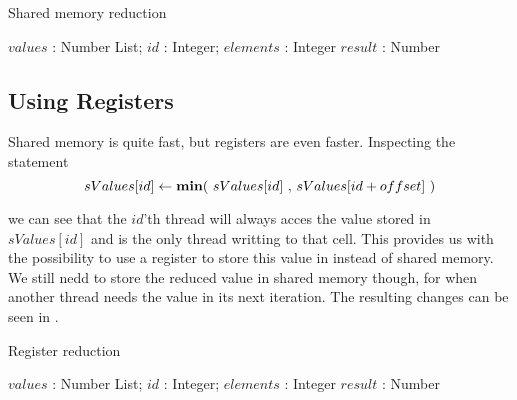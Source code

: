 \begin{algorithm}
  \caption{Shared memory reduction}
  \label{alg:sharedReduct}
  \begin{algorithmic}
              {$values$ : Number List; $id$ : Integer; $elements$ : Integer}
              {$result$ : Number}
              {
                \SYNC
                  \ENDIF
                  \SYNC
                \ENDWHILE
                \ENDIF
              }
  \end{algorithmic}
\end{algorithm}

\subsection{Using Registers}

Shared memory is quite fast, but registers are even faster. Inspecting
the statement 
\begin{displaymath}
  sValues[id] \leftarrow \text{\textbf{min}$($ $sValues[id]$ , $sValues[id + offset]$ $)$}
\end{displaymath}

we can see that the $id$'th thread will always acces the value stored
in $sValues[id]$ and is the only thread writting to that cell. This
provides us with the possibility to use a register to store this value
in instead of shared memory. We still nedd to store the reduced value
in shared memory though, for when another thread needs the value in
its next iteration. The resulting changes can be seen in
.

\begin{algorithm}
  \caption{Register reduction}
  \label{alg:registerReduct}
  \begin{algorithmic}
              {$values$ : Number List; $id$ : Integer; $elements$ : Integer}
              {$result$ : Number}
              {
                \SYNC
                  \ENDIF
                  \SYNC
                \ENDWHILE
                \ENDIF
              }
  \end{algorithmic}
\end{algorithm}



